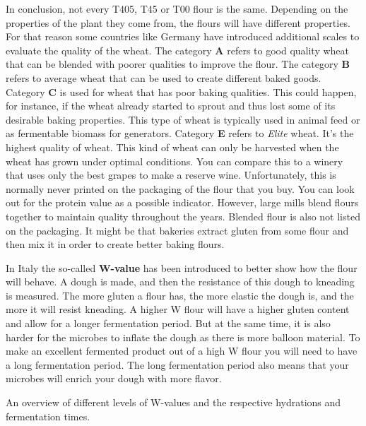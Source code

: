 In conclusion, not every T405, T45 or T00 flour is the same. Depending on the properties
of the plant they come from, the flours will have different properties. For that reason
some countries like Germany have introduced additional scales to evaluate the quality of the
wheat. The category \textbf{A} refers to good quality wheat that can be blended
with poorer qualities to improve the flour. The category \textbf{B} refers to
average wheat that can be used to create different baked goods. Category \textbf{C}
is used for wheat that has poor baking qualities. This could happen, for instance,
if the wheat already started to sprout and thus lost some of its desirable
baking properties. This type of wheat is typically used in animal feed or
as fermentable biomass for generators. Category \textbf{E} refers to \emph{Elite} wheat. It's
the highest quality of wheat. This kind of wheat can only be harvested when the
wheat has grown under optimal conditions. You can compare this to a winery
that uses only the best grapes to make a reserve wine. Unfortunately, this is normally never printed
on the packaging of the flour that you buy. You can look out for the protein
value as a possible indicator. However, large mills blend flours together to
maintain quality throughout the years. Blended flour is also not listed on
the packaging. It might be that bakeries extract gluten from some flour and
then mix it in order to create better baking flours.

In Italy the so-called
\textbf{W-value} has been introduced to better show how the flour will behave.
A dough is made, and then the resistance of this dough to kneading is measured.
The more gluten a flour has, the more elastic the dough is, and the more it will
resist kneading. A higher W flour will have a higher gluten content and allow for a longer
fermentation period. But at the same time, it is also harder for the microbes to
inflate the dough as there is more balloon material. To make an excellent fermented
product out of a high W flour you will need to have a long fermentation period.
The long fermentation period also means that your microbes will enrich
your dough with more flavor.

\begin{table}[!htb]
    \begin{center}
        
        \caption[Fermentation time versus W-value]{An overview of different
            levels of W-values and the respective hydrations and fermentation
            times.}%
        \label{tab:w-value}
    \end{center}
\end{table}

